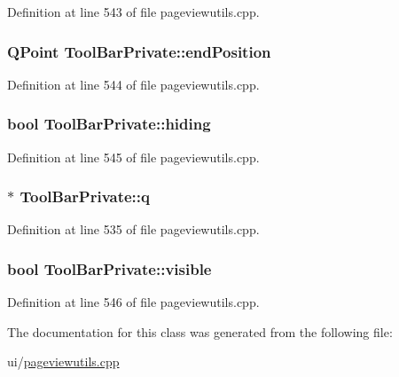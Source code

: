Definition at line 543 of file pageviewutils.\+cpp.

\hypertarget{classToolBarPrivate_a511ae41bfbb54824f46f8410414638db}{
\subsubsection[{end\+Position}]{\setlength{\rightskip}{0pt plus 5cm}Q\+Point Tool\+Bar\+Private\+::end\+Position}}\label{classToolBarPrivate_a511ae41bfbb54824f46f8410414638db}


Definition at line 544 of file pageviewutils.\+cpp.

\hypertarget{classToolBarPrivate_a8731feac9f140a06f4c99bf61e496f2a}{
\subsubsection[{hiding}]{\setlength{\rightskip}{0pt plus 5cm}bool Tool\+Bar\+Private\+::hiding}}\label{classToolBarPrivate_a8731feac9f140a06f4c99bf61e496f2a}


Definition at line 545 of file pageviewutils.\+cpp.

\hypertarget{classToolBarPrivate_a05b6db3d3667cbc748dd957a800eec07}{
\subsubsection[{q}]{$\ast$ Tool\+Bar\+Private\+::q}}\label{classToolBarPrivate_a05b6db3d3667cbc748dd957a800eec07}


Definition at line 535 of file pageviewutils.\+cpp.

\hypertarget{classToolBarPrivate_a2b0694b3affeb089a09763cc2d91fa56}{
\subsubsection[{visible}]{\setlength{\rightskip}{0pt plus 5cm}bool Tool\+Bar\+Private\+::visible}}\label{classToolBarPrivate_a2b0694b3affeb089a09763cc2d91fa56}


Definition at line 546 of file pageviewutils.\+cpp.



The documentation for this class was generated from the following file\+:\begin{DoxyCompactItemize}
\item 
ui/\hyperlink{pageviewutils_8cpp}{pageviewutils.\+cpp}\end{DoxyCompactItemize}
